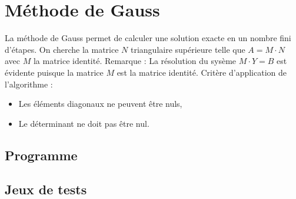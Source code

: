 \documentclass{report}
\begin{document}
    \section{Méthode de Gauss}
      La méthode de Gauss permet de calculer une solution exacte en un nombre fini d'étapes.
      \newline
      On cherche la matrice $N$ triangulaire supérieure telle que $A = M \cdot N$ avec $M$ la matrice identité.
      \newline
      Remarque : La résolution du sysème $M \cdot Y = B$ est évidente puisque la matrice $M$ est la matrice identité.
      \newline
      Critère d'application de l'algorithme :
      \begin{itemize}
        \item{Les éléments diagonaux ne peuvent être nuls,}
        \item{Le déterminant ne doit pas être nul.}
      \end{itemize}
        \lstset{language=C,showstringspaces=false}
      \subsection{Programme}
        
      \subsection{Jeux de tests}
    \newpage
\end{document}
